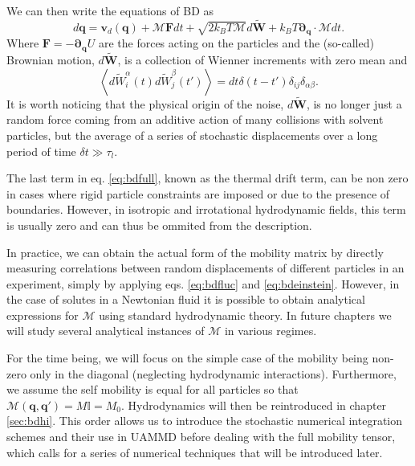 \documentclass[ twoside,openright,titlepage,numbers=noenddot,%
headinclude,footinclude,cleardoublepage=empty,abstract=on,
BCOR=5mm,paper=a4,fontsize=11pt, dvipsnames
]{scrreprt}
\renewcommand{\vec}[1]{\bm{#1}}
\newcommand{\tens}[1]{\bm{\mathcal{#1}}}
\newcommand{\uammd}{\gls{UAMMD}\xspace}
\newcommand{\dt}{\delta t}
\newcommand{\kT}{k_B T}
\newcommand{\noise}{\widetilde{W}}
\newcommand{\ppos}{q}
\begin{document}
We can then write the equations of \gls{BD} as
\begin{equation}
  \label{eq:bdfull}
  d\vec{\ppos} = \vec{v}_d(\vec{\ppos}) + \tens{M}\vec{F}dt + \sqrt{2\kT\tens{M}}d\vec{\noise} + \kT\vec{\partial}_{\vec{\ppos}}\cdot\tens{M}dt.
\end{equation}
Where $\vec{F} = -\vec{\partial}_{\vec{\ppos}}U$ are the forces acting on the particles and the (so-called) Brownian motion, $d\vec{\noise}$, is a collection of Wienner increments with zero mean and
\begin{equation}
\left\langle d\noise_{i}^\alpha(t)d\noise_{j}^\beta(t') \right\rangle = dt\delta(t-t')\delta_{ij}\delta_{\alpha\beta}.
\end{equation}
It is worth noticing that the physical origin of the noise, $d\vec{\noise}$, is no longer just a random force coming from an additive action of many collisions with solvent particles, but the average of a series of stochastic displacements over a long period of time $\dt \gg \tau_l$.

The last term in eq. \eqref{eq:bdfull}, known as the thermal drift term, can be non zero in cases where rigid particle constraints are imposed\cite{Westwood2021} or due to the presence of boundaries\cite{Pelaez2018,Balboa2016,Buscalioni}. However, in isotropic and irrotational hydrodynamic fields, this term is usually zero and can thus be ommited from the description.

In practice, we can obtain the actual form of the mobility matrix by directly measuring correlations between random displacements of different particles\cite{Panzuela2018} in an experiment, simply by applying eqs. \eqref{eq:bdfluc} and \eqref{eq:bdeinstein}. However, in the case of solutes in a Newtonian fluid it is possible to obtain analytical expressions for $\tens{M}$ using standard hydrodynamic theory. In future chapters we will study several analytical instances of $\tens{M}$ in various regimes.

For the time being, we will focus on the simple case of the mobility being non-zero only in the diagonal (neglecting hydrodynamic interactions). Furthermore, we assume the self mobility is equal for all particles so that $\tens{M}(\vec{\ppos}, \vec{\ppos}') = M\mathbb{I} = M_0$. Hydrodynamics will then be reintroduced in chapter \ref{sec:bdhi}. This order allows us to introduce the stochastic numerical integration schemes and their use in \uammd before dealing with the full mobility tensor, which calls for a series of numerical techniques that will be introduced later.
\end{document}
